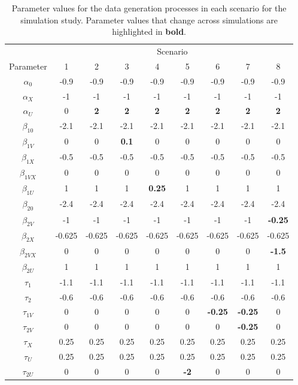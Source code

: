 \begin{appendix}
\begin{refsection}
\begin{table}[p]
    \centering
    \caption{Parameter values for the data generation processes in each scenario for the simulation study. Parameter values that change across simulations are highlighted in \textbf{bold}.}\label{tab:simparams}
    \begin{tabular}{ccccccccc}
        \toprule
        & \multicolumn{8}{c}{Scenario} \\
        \cmidrule{2-9}
        Parameter & 1 & 2 & 3 & 4 & 5 & 6 & 7 & 8  \\
        \midrule
        $\alpha_0$ & -0.9 & -0.9 & -0.9 & -0.9 & -0.9 & -0.9 & -0.9 & -0.9 \\
        $\alpha_X$ & -1 & -1 & -1 & -1 & -1 & -1 & -1 & -1 \\
        $\alpha_U$ & 0 & \textbf{2} & \textbf{2} & \textbf{2} & \textbf{2} & \textbf{2} & \textbf{2} & \textbf{2} \\
        $\beta_{10}$ & -2.1 & -2.1 & -2.1 & -2.1 & -2.1 & -2.1 & -2.1 &  -2.1 \\
        $\beta_{1V}$ & 0 & 0 & \textbf{0.1} & 0 & 0 & 0 & 0 & 0 \\
        $\beta_{1X}$ & -0.5 & -0.5 & -0.5 & -0.5 & -0.5 & -0.5 & -0.5 & -0.5 \\
        $\beta_{1VX}$ & 0 & 0 & 0 & 0 & 0 & 0 & 0 & 0 \\
        $\beta_{1U}$ & 1 & 1 & 1 & \textbf{0.25} & 1 & 1 & 1 & 1 \\
        $\beta_{20}$ & -2.4 & -2.4 & -2.4 & -2.4 & -2.4 & -2.4 & -2.4 &  -2.4 \\
        $\beta_{2V}$ & -1 & -1 & -1 & -1 & -1 & -1 & -1 &  \textbf{-0.25} \\
        $\beta_{2X}$ & -0.625 & -0.625 & -0.625 & -0.625 & -0.625 & -0.625 & -0.625 & -0.625 \\
        $\beta_{2VX}$ & 0 & 0 & 0 & 0 & 0 & 0 & 0 & \textbf{-1.5} \\
        $\beta_{2U}$ & 1 & 1 & 1 & 1 & 1 & 1 & 1 &  1 \\
        $\tau_1$ & -1.1 & -1.1 & -1.1 & -1.1 & -1.1 & -1.1 & -1.1 &  -1.1 \\
        $\tau_2$ & -0.6 & -0.6 & -0.6 & -0.6 & -0.6 & -0.6 & -0.6 &  -0.6 \\
        $\tau_{1V}$ & 0 & 0 & 0 & 0 & 0 & \textbf{-0.25} & \textbf{-0.25} & 0 \\
        $\tau_{2V}$ & 0 & 0 & 0 & 0 & 0 & 0 & \textbf{-0.25} & 0 \\
        $\tau_X$ & 0.25 & 0.25 & 0.25 & 0.25 & 0.25 & 0.25 & 0.25 & 0.25 \\
        $\tau_U$ & 0.25 & 0.25 & 0.25 & 0.25 & 0.25 & 0.25 & 0.25 & 0.25 \\
        $\tau_{2U}$ & 0 & 0  & 0  & 0 & \textbf{-2}  & 0  & 0   & 0  \\
        \bottomrule
    \end{tabular}
\end{table}


\end{refsection}
\end{appendix}
